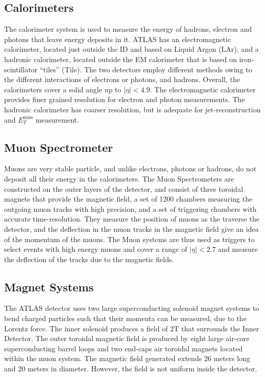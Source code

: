 \documentclass[11pt,a4paper,openright,twoside]{report}
\newcommand{\met}{$E_T^{\mathrm{miss}}$ }
\begin{document}
\subsection{Calorimeters}
The calorimeter system is used to measure the energy of hadrons, electron and photons that leave energy deposits in it. ATLAS has an electromagnetic calorimeter, located just outside the ID and based on Liquid Argon (LAr), and a hadronic calorimeter, located outside the EM calorimeter that is based on iron-scintillator ``tiles'' (Tile). The two detectors employ different methods owing to the different interactions of electrons or photons, and hadrons. Overall, the calorimeters cover a solid angle up to $|\eta|<4.9$. The electromagnetic calorimeter provides finer grained resolution for electron and photon measurements. The hadronic calorimeter has coarser resolution, but is adequate for jet-reconstruction and \met measurement.

\subsection{Muon Spectrometer}
Muons are very stable particle, and unlike electrons, photons or hadrons, do not deposit all their energy in the calorimeters. The Muon Spectrometers are constructed on the outer layers of the detector, and consist of three toroidal magnets that provide the magnetic field, a set of 1200 chambers measuring the outgoing muon tracks with high precision, and a set of triggering chambers with accurate time-resolution. They measure the position of muons as the traverse the detector, and the deflection in the muon tracks in the magnetic field give an idea of the momentum of the muons. The Muon systems are thus used as triggers to select events with high energy muons and cover a range of $|\eta|<2.7$ and measure the deflection of the tracks due to the magnetic fields. 

\subsection{Magnet Systems}
The ATLAS detector uses two large superconducting solenoid magnet systems to bend charged particles such that their momenta can be measured, due to the Lorentz force. The inner solenoid produces a field of 2T that surrounds the Inner Detector. The outer toroidal magnetic field is produced by eight large air-core superconducting barrel loops and two end-caps air toroidal magnets located within the muon system. The magnetic field generated extends 26 meters long and 20 meters in diameter. However, the field is not uniform inside the detector.
\end{document}

